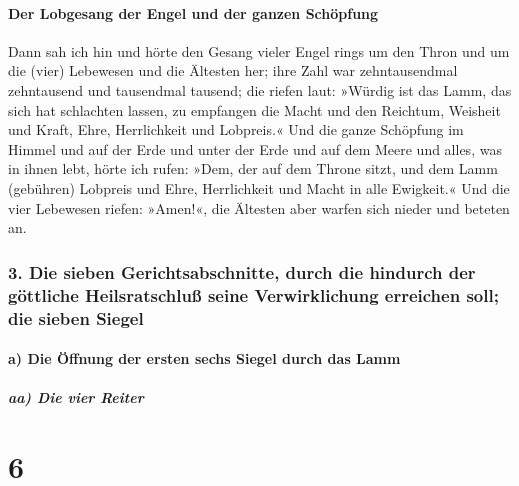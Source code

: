 \hypertarget{der-lobgesang-der-engel-und-der-ganzen-schuxf6pfung}{%
\paragraph{Der Lobgesang der Engel und der ganzen
Schöpfung}\label{der-lobgesang-der-engel-und-der-ganzen-schuxf6pfung}}

 Dann sah ich hin und hörte den Gesang vieler Engel rings
um den Thron und um die (vier) Lebewesen und die Ältesten her; ihre Zahl
war zehntausendmal zehntausend und tausendmal tausend; 
die riefen laut: »Würdig ist das Lamm, das sich hat schlachten lassen,
zu empfangen die Macht und den Reichtum, Weisheit und Kraft, Ehre,
Herrlichkeit und Lobpreis.«  Und die ganze Schöpfung im
Himmel und auf der Erde und unter der Erde und auf dem Meere und alles,
was in ihnen lebt, hörte ich rufen: »Dem, der auf dem Throne sitzt, und
dem Lamm (gebühren) Lobpreis und Ehre, Herrlichkeit und Macht in alle
Ewigkeit.«  Und die vier Lebewesen riefen: »Amen!«, die
Ältesten aber warfen sich nieder und beteten an.

\hypertarget{die-sieben-gerichtsabschnitte-durch-die-hindurch-der-guxf6ttliche-heilsratschluuxdf-seine-verwirklichung-erreichen-soll-die-sieben-siegel}{%
\subsubsection{3. Die sieben Gerichtsabschnitte, durch die hindurch der
göttliche Heilsratschluß seine Verwirklichung erreichen soll; die sieben
Siegel}\label{die-sieben-gerichtsabschnitte-durch-die-hindurch-der-guxf6ttliche-heilsratschluuxdf-seine-verwirklichung-erreichen-soll-die-sieben-siegel}}

\hypertarget{a-die-uxf6ffnung-der-ersten-sechs-siegel-durch-das-lamm}{%
\paragraph{a) Die Öffnung der ersten sechs Siegel durch das
Lamm}\label{a-die-uxf6ffnung-der-ersten-sechs-siegel-durch-das-lamm}}

\hypertarget{aa-die-vier-reiter}{%
\subparagraph{aa) Die vier Reiter}\label{aa-die-vier-reiter}}

\hypertarget{section-5}{%
\section{6}\label{section-5}}


